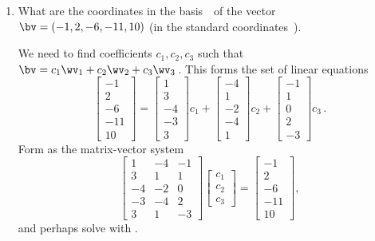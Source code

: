 \begin{example}
\begin{enumerate}
\item What are the coordinates in the basis~\cW\ of the vector \(\sloppy\bv=(-1,2,-6,-11,10)\) (in the standard coordinates~\cE).
\begin{solution} 
We need to find coefficients \(c_1,c_2,c_3\) such that \(\bv=c_1\wv_1+c_2\wv_2+c_3\wv_3\)\,.
This forms the set of linear equations
\begin{equation*}
\begin{bmatrix}-1\\2\\-6\\-11\\10 \end{bmatrix}
=\begin{bmatrix} 1\\3\\-4\\-3\\3 \end{bmatrix}c_1
+\begin{bmatrix} -4\\1\\-2\\-4\\1 \end{bmatrix}c_2
+\begin{bmatrix} -1\\1\\0\\2\\-3 \end{bmatrix}c_3\,.
\end{equation*}
Form as the matrix-vector system
\begin{equation*}
\begin{bmatrix}1&-4&-1
\\ 3&1&1
\\-4&-2&0
\\-3&-4&2
\\ 3&1&-3\end{bmatrix}
\begin{bmatrix} c_1\\c_2\\c_3 \end{bmatrix}
=\begin{bmatrix}-1\\2\\-6\\-11\\10 \end{bmatrix},
\end{equation*}
and perhaps solve with \script.

\end{solution}
\end{enumerate}
\end{example}
